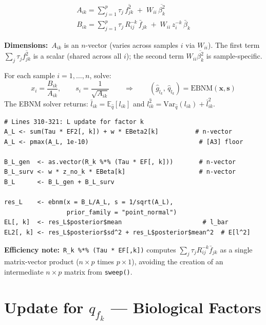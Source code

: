 \documentclass[11pt]{article}
\newcommand{\lbar}[2]{\bar{l}_{#1#2}}
\newcommand{\fbar}[2]{\bar{f}_{#1#2}}
\newcommand{\betabar}[1]{\bar{\beta}_{#1}}
\newcommand{\lsec}[2]{\overline{l^2_{#1#2}}}
\newcommand{\fsec}[2]{\overline{f^2_{#1#2}}}
\newcommand{\betasec}[1]{\overline{\beta^2_{#1}}}
\newcommand{\coderef}[1]{{\color{blue!70!black}\texttt{#1}}}
\begin{document}
\begin{align}
  \boxed{A_{ik} = \sum_{j=1}^p \tau_j\,\fsec{j}{k} \;+\; W_{ii}\,\betasec{k}}
  \label{eq:A-L} \\[4pt]
  \boxed{B_{ik} = \sum_{j=1}^p \tau_j\,R^{-k}_{ij}\,\fbar{j}{k}
                  \;+\; W_{ii}\,z^{-k}_i\,\betabar{k}}
  \label{eq:B-L}
\end{align}

\textbf{Dimensions:}\ $A_{ik}$ is an $n$-vector (varies across samples $i$
via $W_{ii}$).  The first term $\sum_j \tau_j \fsec{j}{k}$ is a scalar
(shared across all $i$); the second term $W_{ii}\betasec{k}$ is
sample-specific.

\begin{ebnmbox}
For each sample $i = 1,\ldots,n$, solve:
\[
  x_i = \frac{B_{ik}}{A_{ik}}, \qquad s_i = \frac{1}{\sqrt{A_{ik}}}
  \qquad \Longrightarrow \qquad
  (\hat{g}_{l_k},\, \hat{q}_{l_k}) = \mathrm{EBNM}(\mathbf{x}, \mathbf{s})
\]
The EBNM solver returns:
$\lbar{i}{k} = \mathbb{E}_{\hat{q}}[l_{ik}]$ and
$\lsec{i}{k} = \mathrm{Var}_{\hat{q}}(l_{ik}) + \lbar{i}{k}^2$.
\end{ebnmbox}

\begin{codebox}
\begin{lstlisting}[style=Rstyle]
# Lines 310-321: L update for factor k
A_L <- sum(Tau * EF2[, k]) + w * EBeta2[k]          # n-vector
A_L <- pmax(A_L, 1e-10)                              # [A3] floor

B_L_gen  <- as.vector(R_k %*% (Tau * EF[, k]))       # n-vector
B_L_surv <- w * z_no_k * EBeta[k]                    # n-vector
B_L      <- B_L_gen + B_L_surv

res_L    <- ebnm(x = B_L/A_L, s = 1/sqrt(A_L),
                 prior_family = "point_normal")
EL[, k]  <- res_L$posterior$mean                      # l_bar
EL2[, k] <- res_L$posterior$sd^2 + res_L$posterior$mean^2  # E[l^2]
\end{lstlisting}
\textbf{Efficiency note:}\ \coderef{R\_k \%*\% (Tau * EF[,k])} computes
$\sum_j \tau_j R^{-k}_{ij} \fbar{j}{k}$ as a single matrix-vector product
($n\times p$ times $p\times 1$), avoiding the creation of an intermediate
$n\times p$ matrix from \texttt{sweep()}.
\end{codebox}

\section{Update for \texorpdfstring{$q_{f_k}$}{q(fk)} --- Biological Factors}
\label{sec:update-F}
\end{document}
